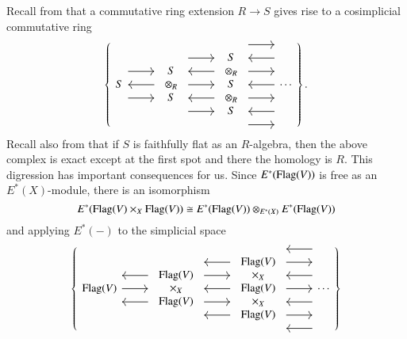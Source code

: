 Recall from  that a commutative ring extension $R \rightarrow S$ gives rise to a cosimplicial commutative ring
\[\left\{
\begin{tikzcd}[ampersand replacement=\&]
S \arrow[leftarrow]{r} \arrow[shift left=\baselineskip]{r} \arrow[shift right=\baselineskip]{r} \&
\begin{array}{c} S \\ \otimes_R \\ S \end{array} \arrow[shift left=(2*\baselineskip)]{r} \arrow[leftarrow, shift left=\baselineskip]{r} \arrow{r} \arrow[leftarrow, shift right=\baselineskip]{r} \arrow[shift right=(2*\baselineskip)]{r} \&
\begin{array}{c} S \\ \otimes_R \\ S \\ \otimes_R \\ S \end{array} \arrow[shift left=(3*\baselineskip)]{r} \arrow[leftarrow, shift left=(2*\baselineskip)]{r} \arrow[shift left=\baselineskip]{r} \arrow[leftarrow]{r} \arrow[shift right=\baselineskip]{r} \arrow[leftarrow, shift right=(2*\baselineskip)]{r} \arrow[shift right=(3*\baselineskip)]{r} \&
\cdots
\end{tikzcd}
\right\}.\]
Recall also from  that if $S$ is faithfully flat as an $R$-algebra, then the above complex is exact except at the first spot and there the homology is $R$.  This digression has important consequences for us. Since $E^*(\operatorname{Flag}(V))$ is free as an $E^*(X)$-module, there is an isomorphism
\[
E^*(\operatorname{Flag}(V) \times_X \operatorname{Flag}(V)) \cong E^*(\operatorname{Flag}(V)) \otimes_{E^*(X)} E^*(\operatorname{Flag}(V))
\]
and applying $E^*(-)$ to the simplicial space
\[\left\{
\begin{tikzcd}[ampersand replacement=\&]
\Flag(V) \arrow{r} \arrow[leftarrow,shift left=\baselineskip]{r} \arrow[leftarrow,shift right=\baselineskip]{r} \&
\begin{array}{c} \Flag(V) \\ \times_X \\ \Flag(V) \end{array} \arrow[leftarrow, shift left=(2*\baselineskip)]{r} \arrow[shift left=\baselineskip]{r} \arrow[leftarrow]{r} \arrow[shift right=\baselineskip]{r} \arrow[leftarrow, shift right=(2*\baselineskip)]{r} \&
\begin{array}{c} \Flag(V) \\ \times_X \\ \Flag(V) \\ \times_X \\ \Flag(V) \end{array} \arrow[leftarrow, shift left=(3*\baselineskip)]{r} \arrow[shift left=(2*\baselineskip)]{r} \arrow[leftarrow, shift left=\baselineskip]{r} \arrow{r} \arrow[leftarrow, shift right=\baselineskip]{r} \arrow[shift right=(2*\baselineskip)]{r} \arrow[leftarrow, shift right=(3*\baselineskip)]{r} \&
\cdots
\end{tikzcd}
\right\}\]
